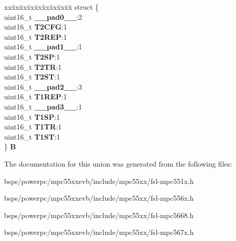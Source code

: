 \begin{DoxyCompactItemize}
\begin{tabbing}
\end{tabbing}\item 
\mbox{\label{unionuTICCR_a68b9341360605118cf664399683bb724}} 
\begin{tabbing}
xx\=xx\=xx\=xx\=xx\=xx\=xx\=xx\=xx\=\kill
struct \{\\
\>uint16\_t {\bfseries \_\_pad0\_\_}:2\\
\>uint16\_t {\bfseries T2CFG}:1\\
\>uint16\_t {\bfseries T2REP}:1\\
\>uint16\_t {\bfseries \_\_pad1\_\_}:1\\
\>uint16\_t {\bfseries T2SP}:1\\
\>uint16\_t {\bfseries T2TR}:1\\
\>uint16\_t {\bfseries T2ST}:1\\
\>uint16\_t {\bfseries \_\_pad2\_\_}:3\\
\>uint16\_t {\bfseries T1REP}:1\\
\>uint16\_t {\bfseries \_\_pad3\_\_}:1\\
\>uint16\_t {\bfseries T1SP}:1\\
\>uint16\_t {\bfseries T1TR}:1\\
\>uint16\_t {\bfseries T1ST}:1\\
\} {\bfseries B}\\

\end{tabbing}\end{DoxyCompactItemize}


The documentation for this union was generated from the following files\+:\begin{DoxyCompactItemize}
\item 
bsps/powerpc/mpc55xxevb/include/mpc55xx/fsl-\/mpc551x.\+h\item 
bsps/powerpc/mpc55xxevb/include/mpc55xx/fsl-\/mpc556x.\+h\item 
bsps/powerpc/mpc55xxevb/include/mpc55xx/fsl-\/mpc5668.\+h\item 
bsps/powerpc/mpc55xxevb/include/mpc55xx/fsl-\/mpc567x.\+h\end{DoxyCompactItemize}
